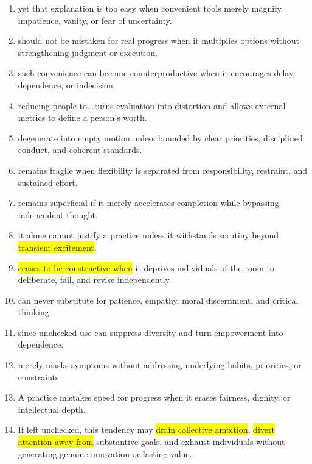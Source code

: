 ﻿\documentclass[lang=cn,11pt]{elegantbook}
\begin{document}
\begin{enumerate}
\item yet that explanation is too easy when convenient tools merely magnify impatience, vanity, or fear of uncertainty.
\item should not be mistaken for real progress when it multiplies options without strengthening judgment or execution.
\item such convenience can become counterproductive when it encourages delay, dependence, or indecision.
\item reducing people to...turns evaluation into distortion and allows external metrics to define a person's worth.
\item degenerate into empty motion unless bounded by clear priorities, disciplined conduct, and coherent standards.
\item remains fragile when flexibility is separated from responsibility, restraint, and sustained effort.
\item remains superficial if it merely accelerates completion while bypassing independent thought.
\item it alone cannot justify a practice unless it withstands scrutiny beyond \colorbox{yellow}{transient excitement}.
\item \colorbox{yellow}{ceases to be constructive when} it deprives individuals of the room to deliberate, fail, and revise independently.
\item can never substitute for patience, empathy, moral discernment, and critical thinking.
\item since unchecked use can suppress diversity and turn empowerment into dependence.
\item merely masks symptoms without addressing underlying habits, priorities, or constraints.
\item A practice mistakes speed for progress when it erases fairness, dignity, or intellectual depth.
\item If left unchecked, this tendency may \colorbox{yellow}{drain collective ambition}, \colorbox{yellow}{divert attention away from} substantive goals, and exhaust individuals without generating genuine innovation or lasting value.
\end{enumerate}
\end{document}
